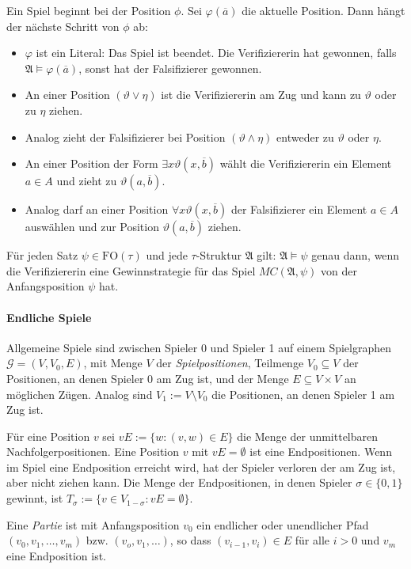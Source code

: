 \documentclass{panikzettel}
\newcommand{\A}{\mathfrak{A}}
\newcommand{\FO}{\mathrm{FO}}
\begin{document}
Ein Spiel beginnt bei der Position $\phi$. Sei $\varphi(\overline{a})$ die aktuelle Position. Dann hängt der nächste Schritt von $\phi$ ab:
\begin{itemize}
    \item $\varphi$ ist ein Literal: Das Spiel ist beendet. Die Verifiziererin hat gewonnen, falls $\A \models \varphi(\overline{a})$, sonst hat der Falsifizierer gewonnen.
    \item An einer Position $(\vartheta \lor \eta)$ ist die Verifiziererin am Zug und kann zu $\vartheta$ oder zu $\eta$ ziehen.
    \item Analog zieht der Falsifizierer bei Position $(\vartheta \land \eta)$ entweder zu $\vartheta$ oder $\eta$.
    \item An einer Position der Form $\exists x \vartheta (x,\overline{b})$ wählt die Verifiziererin ein Element $a \in A$ und zieht zu $\vartheta(a,\overline{b})$.
    \item Analog darf an einer Position $\forall x \vartheta(x,\overline{b})$ der Falsifizierer ein Element $a \in A$ auswählen und zur Position $\vartheta(a,\overline{b})$ ziehen.
\end{itemize}

Für jeden Satz $\psi \in \FO(\tau)$ und jede $\tau$-Struktur $\A$ gilt: $\A \models \psi$ genau dann, wenn die Verifiziererin eine Gewinnstrategie für das Spiel $MC(\A,\psi)$ von der Anfangsposition $\psi$ hat.

\paragraph{Endliche Spiele} Allgemeine Spiele sind zwischen Spieler 0 und Spieler 1 auf einem Spielgraphen $\mathcal{G}=(V,V_0,E)$, mit Menge $V$ der \emph{Spielpositionen}, Teilmenge $V_0 \subseteq V$ der Positionen, an denen Spieler 0 am Zug ist, und der Menge $E \subseteq V \times V$ an möglichen Zügen.
Analog sind $V_1 := V \setminus V_0$ die Positionen, an denen Spieler 1 am Zug ist.

Für eine Position $v$ sei $vE:=\{w:(v,w)\in E\}$ die Menge der unmittelbaren Nachfolgerpositionen. Eine Position $v$ mit $vE=\emptyset$ ist eine Endpositionen. Wenn im Spiel eine Endposition erreicht wird, hat der Spieler verloren der am Zug ist, aber nicht ziehen kann. Die Menge der Endpositionen, in denen Spieler $\sigma \in \{0,1\}$ gewinnt, ist $T_{\sigma}:=\{v \in V_{1-\sigma}:vE=\emptyset\}$.

Eine \emph{Partie} ist mit Anfangsposition $v_0$ ein endlicher oder unendlicher Pfad $(v_0,v_1,\ldots,v_m)$ bzw. $(v_o,v_1,\ldots)$, so dass $(v_{i-1},v_i) \in E$ für alle $i>0$ und $v_m$ eine Endposition ist.
\end{document}
